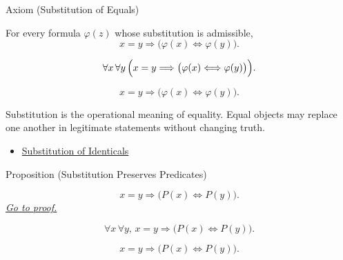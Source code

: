 \begin{axiombox}{Axiom (Substitution of Equals)}
\begin{axiom}
\label{ax:equality-substitution}
For every formula $\varphi(z)$ whose substitution is admissible,
\[
x=y \Longrightarrow \bigl(\varphi(x)\Longleftrightarrow\varphi(y)\bigr).
\]
\end{axiom}
\end{axiombox}

\begin{remark*}
\[
\forall x\,\forall y\,
\Bigl(x=y \Longrightarrow
\bigl(\varphi(x)\Longleftrightarrow\varphi(y)\bigr)\Bigr).
\]
\end{remark*}

\begin{remark*}
\[
x=y \Longrightarrow \bigl(\varphi(x)\Longleftrightarrow\varphi(y)\bigr).
\]
\end{remark*}

\begin{remark*}[Interpretation]
Substitution is the operational meaning of equality. Equal objects may replace
one another in legitimate statements without changing truth.
\end{remark*}

\begin{dependencies}
\begin{itemize}
  \item \hyperref[ax:axiomatic-equality-substitution]{Substitution of Identicals}
\end{itemize}
\end{dependencies}

\begin{propositionbox}{Proposition (Substitution Preserves Predicates)}
\begin{proposition}
\label{prop:substitution-preserves-predicates}
\[
x=y \Longrightarrow \bigl(P(x)\Longleftrightarrow P(y)\bigr).
\]
\hyperref[prf:substitution-preserves-predicates]{\textit{Go to proof.}}
\end{proposition}
\end{propositionbox}

\begin{remark*}
\[
\forall x\,\forall y,\,
x=y \Longrightarrow \bigl(P(x)\Longleftrightarrow P(y)\bigr).
\]
\end{remark*}

\begin{remark*}
\[
x=y \Longrightarrow \bigl(P(x)\Longleftrightarrow P(y)\bigr).
\]
\end{remark*}

